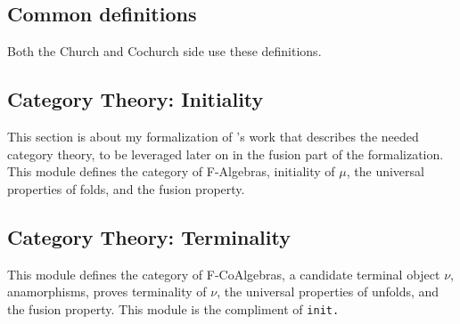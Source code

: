 \subsection{Common definitions}
Both the Church and Cochurch side use these definitions.



\subsection{Category Theory: Initiality}
This section is about my formalization of \cite{Harper2011}'s work that describes the needed category theory, to be leveraged later on in the fusion part of the formalization.
This module defines the category of F-Algebras, initiality of $\mu$, the universal properties of folds, and the fusion property.



\subsection{Category Theory: Terminality}
This module defines the category of F-CoAlgebras, a candidate terminal object $\nu$, anamorphisms, proves terminality of $\nu$, the universal properties of unfolds, and the fusion property.
This module is the compliment of \tt{init}.



